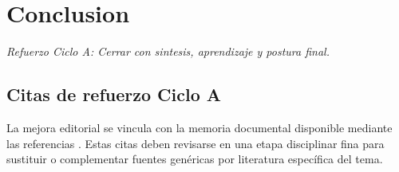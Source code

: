 \documentclass[
	spanish,
	letterpaper, oneside
]{article}
\begin{document}

\section{Conclusion}

\textit{Refuerzo Ciclo A: Cerrar con sintesis, aprendizaje y postura final.}





\subsection*{Citas de refuerzo Ciclo A}
La mejora editorial se vincula con la memoria documental disponible mediante las referencias \citep{unadm100TecnicasDidacticas2023,cicloARefuerzo02,cicloARefuerzo03,cicloARefuerzo04,cicloARefuerzo05}. Estas citas deben revisarse en una etapa disciplinar fina para sustituir o complementar fuentes genéricas por literatura específica del tema.
\end{document}
